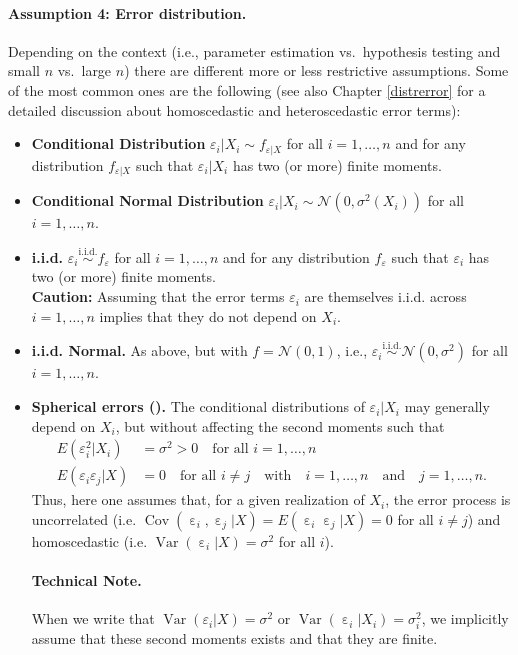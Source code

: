 \documentclass[
  14pt,
]{memoir}
\DeclareMathOperator{\Cov}{Cov}
\DeclareMathOperator{\eps}{\varepsilon}
\DeclareMathOperator{\V}{\operatorname{Var}}
\begin{document}
\paragraph*{Assumption 4: Error distribution.}

Depending on the context (i.e., parameter estimation vs.~hypothesis testing and small \(n\) vs.~large \(n\)) there are different more or less restrictive assumptions. Some of the most common ones are the following (see also Chapter \ref{distrerror} for a detailed discussion about homoscedastic and heteroscedastic error terms):

\begin{itemize}
\item\textbf{Conditional Distribution} $\varepsilon_i|X_i \sim f_{\varepsilon|X}$ for all $i=1,\dots,n$ and for any distribution $f_{\varepsilon|X}$ such that $\varepsilon_i|X_i$ has two (or more) finite moments.
\item\textbf{Conditional Normal Distribution} $\varepsilon_i|X_i \sim \mathcal{N}(0,\sigma^2(X_i))$ for all $i=1,\dots,n$.
\item\textbf{i.i.d.} $\varepsilon_i\overset{\operatorname{i.i.d.}}{\sim}f_\varepsilon$  for all $i=1,\dots,n$ and for any distribution $f_\varepsilon$ such that $\varepsilon_i$ has two (or more) finite moments.\\ 
\textbf{Caution:} Assuming that the error terms $\varepsilon_i$ are themselves i.i.d. across $i=1,\dots,n$ implies that they do not depend on $X_i$. 
\item\textbf{i.i.d. Normal.} As above, but with $f=\mathcal{N}(0,1)$, i.e., $\varepsilon_i\overset{\operatorname{i.i.d.}}{\sim}\mathcal{N}(0,\sigma^2)$ for all $i=1,\dots,n$. 
\item \textbf{Spherical errors ().} The conditional distributions of  $\varepsilon_i|X_i$ may generally depend on $X_i$, but without affecting the second moments such that
\begin{align*}
E(\varepsilon_i^2|X_i)         &=\sigma^2>0\quad\text{for all }i=1,\dots,n\\
E(\varepsilon_i\varepsilon_j|X)&=0\quad\text{for all }i\neq j\quad\text{with}\quad i=1,\dots,n\quad\text{and}\quad j=1,\dots,n.
\end{align*}
Thus, here one assumes that, for a given realization of $X_i$, the error process is uncorrelated (i.e. $\Cov(\eps_i,\eps_j|X)=E(\eps_i\eps_j|X)=0$ for all $i\neq j$) and homoscedastic (i.e. $\V(\eps_i|X)=\sigma^2$ for all $i$).



\paragraph*{Technical Note.} When we write that $\V(\varepsilon_i|X)=\sigma^2$ or $\V(\eps_i|X_i)=\sigma^2_i$, we implicitly assume that these second moments exists and that they are finite. 
\end{itemize}
\end{document}
